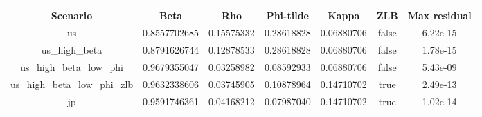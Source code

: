 \begin{table}[!ht]
\setlength\tabcolsep{0.425em}
\setlength\aboverulesep{0pt}
\setlength\belowrulesep{0.2em}
\centering
\begin{threeparttable}
\begin{tabular}{ccccccc}
\toprule[0.1em]
Scenario & Beta & Rho & Phi-tilde & Kappa & ZLB & Max residual \\[0.2em]
\midrule[0.075em]
us & 0.8557702685 & 0.15575332 & 0.28618828 & 0.06880706 & false & 6.22e-15 \\[0.2em]
us\_high\_beta & 0.8791626744 & 0.12878533 & 0.28618828 & 0.06880706 & false & 1.78e-15 \\[0.2em]
us\_high\_beta\_low\_phi & 0.9679355047 & 0.03258982 & 0.08592933 & 0.06880706 & false & 5.43e-09 \\[0.2em]
us\_high\_beta\_low\_phi\_zlb & 0.9632338606 & 0.03745905 & 0.10878964 & 0.14710702 & true & 2.49e-13 \\[0.2em]
jp & 0.9591746361 & 0.04168212 & 0.07987040 & 0.14710702 & true & 1.02e-14 \\[0.2em]
\bottomrule[0.1em]
\end{tabular}
\end{threeparttable}
\end{table}
